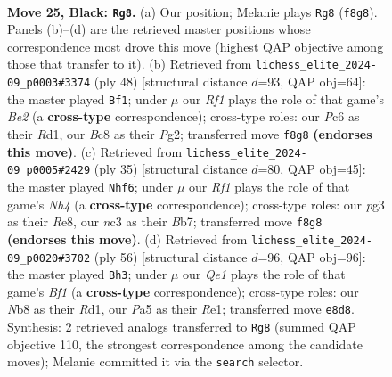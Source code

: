 \documentclass[11pt]{article}
\begin{document}
\clearpage

\begin{figure}[p]\centering
\begin{subfigure}{0.46\textwidth}\centering
\resizebox{\linewidth}{!}{%
\newchessgame
\chessboard[
  setfen={1nb1qr2/rp3k2/2p1p3/p2p1p1p/Pn1P1P1N/2N3P1/1PPQ3P/3R1BKR b - - 4 25},
  showmover=false,
  pgfstyle=straightmove, color=movearrow, markmove={f8-g8}
]}
\caption{}
\end{subfigure}\hfill
\begin{subfigure}{0.46\textwidth}\centering
\resizebox{\linewidth}{!}{%
\newchessgame
\chessboard[
  setfen={2r4r/1b2q1k1/1p1p2pp/p1nPpp2/P1P5/4NP2/1P2BQPP/R2R2K1 w - - 3 25},
  showmover=false,
  pgfstyle=straightmove, color=movearrow, markmove={e2-f1}
]}
\caption{}
\end{subfigure}
\\[4pt]
\begin{subfigure}{0.46\textwidth}\centering
\resizebox{\linewidth}{!}{%
\newchessgame
\chessboard[
  setfen={2r1r3/1bqn1pk1/p2pp1pp/1pp4n/4P3/P1NP3P/BPPQ1PPN/3RR1K1 b - - 1 18},
  showmover=false,
  pgfstyle=straightmove, color=movearrow, markmove={h5-f6}
]}
\caption{}
\end{subfigure}\hfill
\begin{subfigure}{0.46\textwidth}\centering
\resizebox{\linewidth}{!}{%
\newchessgame
\chessboard[
  setfen={3r4/3r2k1/1pq2pp1/p1pnpn1p/4N2P/2PP2P1/1PQ2P2/3RRBK1 w - - 2 29},
  showmover=false,
  pgfstyle=straightmove, color=movearrow, markmove={f1-h3}
]}
\caption{}
\end{subfigure}
\caption{\textbf{Move 25, Black: \texttt{Rg8}.} (a) Our position; Melanie plays \texttt{Rg8} (\texttt{f8g8}). Panels (b)--(d) are the retrieved master positions whose correspondence most drove this move (highest QAP objective among those that transfer to it). (b) Retrieved from \texttt{lichess\_elite\_2024-09\_p0003\#3374} (ply 48) [structural distance $d$=93, QAP obj=64]: the master played \texttt{Bf1}; under $\mu$ our \emph{Rf1} plays the role of that game's \emph{Be2} (a \textbf{cross-type} correspondence); cross-type roles: our \emph{P}c6 as their \emph{R}d1, our \emph{B}c8 as their \emph{P}g2; transferred move \texttt{f8g8} \textbf{(endorses this move)}. (c) Retrieved from \texttt{lichess\_elite\_2024-09\_p0005\#2429} (ply 35) [structural distance $d$=80, QAP obj=45]: the master played \texttt{Nhf6}; under $\mu$ our \emph{Rf1} plays the role of that game's \emph{Nh4} (a \textbf{cross-type} correspondence); cross-type roles: our \emph{p}g3 as their \emph{R}e8, our \emph{n}c3 as their \emph{B}b7; transferred move \texttt{f8g8} \textbf{(endorses this move)}. (d) Retrieved from \texttt{lichess\_elite\_2024-09\_p0020\#3702} (ply 56) [structural distance $d$=96, QAP obj=96]: the master played \texttt{Bh3}; under $\mu$ our \emph{Qe1} plays the role of that game's \emph{Bf1} (a \textbf{cross-type} correspondence); cross-type roles: our \emph{N}b8 as their \emph{R}d1, our \emph{P}a5 as their \emph{R}e1; transferred move \texttt{e8d8}. Synthesis: 2 retrieved analogs transferred to \texttt{Rg8} (summed QAP objective 110, the strongest correspondence among the candidate moves); Melanie committed it via the \texttt{search} selector.}

\end{figure}
\end{document}
